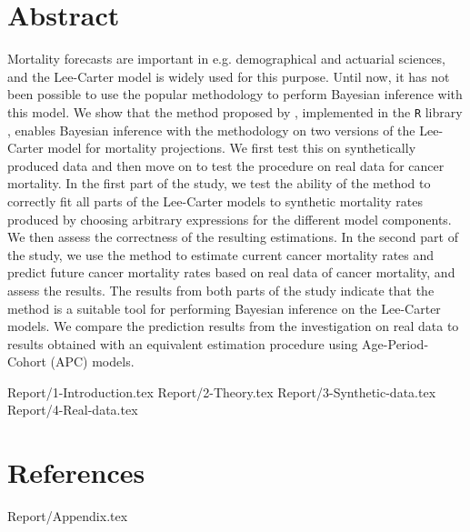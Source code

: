 \documentclass[11pt,a4paper,twoside]{article}
\numberwithin{equation}{section}
\numberwithin{figure}{section}
\begin{document}
\maketitle\thispagestyle{empty}
\clearpage{}

\section*{Abstract}
Mortality forecasts are important in e.g. demographical and actuarial sciences, and the Lee-Carter model \parencite{LeeCarter1992} is widely used for this purpose. Until now, it has not been possible to use the popular \inla methodology to perform Bayesian inference with this model. We show that the method proposed by \textcite{BachlLindgren2019}, implemented in the \texttt{R} library \inlabru, enables Bayesian inference with the \inla methodology on two versions of the Lee-Carter model for mortality projections. We first test this on synthetically produced data and then move on to test the procedure on real data for cancer mortality. In the first part of the study, we test the ability of the \inlabru method to correctly fit all parts of the Lee-Carter models to synthetic mortality rates produced by choosing arbitrary expressions for the different model components. We then assess the correctness of the resulting estimations. In the second part of the study, we use the \inlabru method to estimate current cancer mortality rates and predict future cancer mortality rates based on real data of cancer mortality, and assess the results. The results from both parts of the study indicate that the \inlabru method is a suitable tool for performing Bayesian inference on the Lee-Carter models. We compare the prediction results from the investigation on real data to results obtained with an equivalent estimation procedure using Age-Period-Cohort (APC) models. 

\clearpage\tableofcontents
\newpage
\printacronyms

\clearpage{}
{Report/1-Introduction.tex}
{Report/2-Theory.tex}
{Report/3-Synthetic-data.tex}
{Report/4-Real-data.tex}


\clearpage
\section*{References}
\printbibliography[heading=none]
%
%
%

\begin{appendices}
\clearpage
{Report/Appendix.tex}
\end{appendices}
\end{document}

